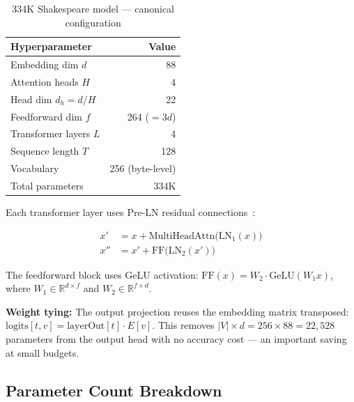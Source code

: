 \documentclass[11pt]{article}
\begin{document}
\begin{table}[ht]
\centering
\begin{tabular}{lr}
\toprule
Hyperparameter & Value \\
\midrule
Embedding dim $d$ & 88 \\
Attention heads $H$ & 4 \\
Head dim $d_h = d/H$ & 22 \\
Feedforward dim $f$ & 264 ($= 3d$) \\
Transformer layers $L$ & 4 \\
Sequence length $T$ & 128 \\
Vocabulary & 256 (byte-level) \\
\midrule
Total parameters & 334K \\
\bottomrule
\end{tabular}
\caption{334K Shakespeare model — canonical configuration}
\label{tab:arch}
\end{table}

Each transformer layer uses Pre-LN residual connections~\cite{xiong2020layer}:

\begin{align}
x' &= x + \text{MultiHeadAttn}\bigl(\text{LN}_1(x)\bigr) \\
x'' &= x' + \text{FF}\bigl(\text{LN}_2(x')\bigr)
\end{align}

The feedforward block uses GeLU activation:
$\text{FF}(x) = W_2 \cdot \text{GeLU}(W_1 x)$, where $W_1 \in \mathbb{R}^{d \times f}$
and $W_2 \in \mathbb{R}^{f \times d}$.

\textbf{Weight tying:} The output projection reuses the embedding matrix transposed:
$\text{logits}[t, v] = \text{layerOut}[t] \cdot E[v]$.
This removes $|V| \times d = 256 \times 88 = 22{,}528$ parameters from the output head
with no accuracy cost --- an important saving at small budgets.

\subsection{Parameter Count Breakdown}
\end{document}
